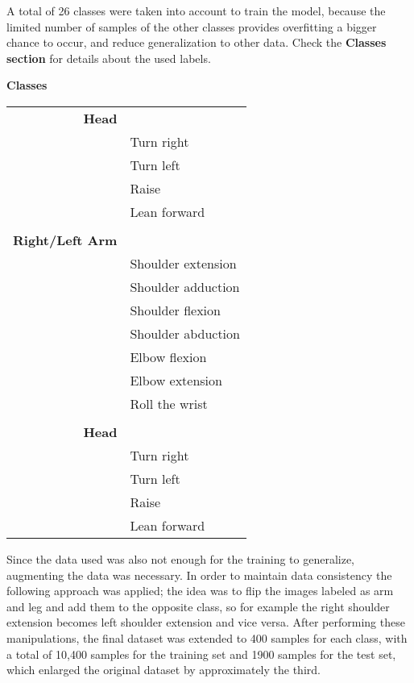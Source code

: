 \documentclass{article}
\begin{document}
A total of 26 classes were taken into account to train the model, because the limited number of samples of the other classes provides overfitting a bigger chance to occur, and reduce generalization to other data. Check the \textbf{Classes section} for details about the used labels.\newline


\textbf{Classes}
\newline
\par
\begin{tabular}{r|p{11cm}}

\textbf{Head}\\ &\footnotesize{Turn right} \\ &\footnotesize{Turn left} \\ &\footnotesize{Raise}\\ &\footnotesize{Lean forward}\\\multicolumn{2}{c}{} \\

\textbf{Right/Left Arm}\\ &\footnotesize{Shoulder extension} \\ &\footnotesize{Shoulder adduction} \\ &\footnotesize{Shoulder flexion}\\ &\footnotesize{Shoulder abduction}\\ &\footnotesize{Elbow flexion}\\ &\footnotesize{Elbow extension}\\ &\footnotesize{Roll the wrist}\\\multicolumn{2}{c}{} \\

\textbf{Head}\\ &\footnotesize{Turn right} \\ &\footnotesize{Turn left} \\ &\footnotesize{Raise}\\ &\footnotesize{Lean forward}\\

\end{tabular}
\newline


Since the data used was also not enough for the training to generalize, augmenting the data was necessary. In order to maintain data consistency the following approach was applied; the idea was to flip the images labeled as arm and leg and add them to the opposite class, so for example the right shoulder extension becomes left shoulder extension and vice versa. After performing these manipulations, the final dataset was extended to 400 samples for each class, with a total of 10,400 samples for the training set and 1900 samples for the test set, which enlarged the original dataset by approximately the third.
\end{document}
